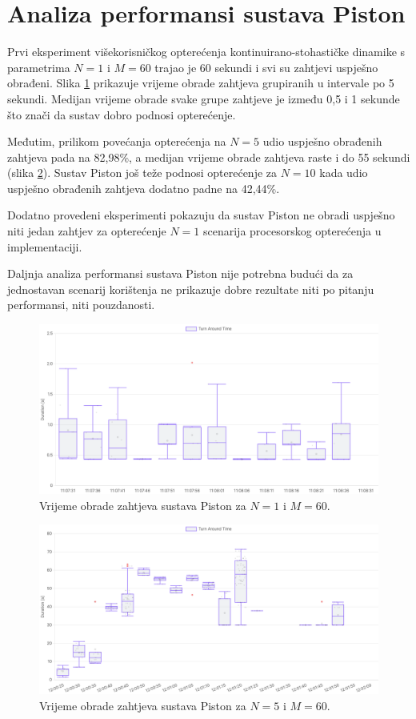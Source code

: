 \documentclass[times, utf8, diplomski]{fer}
\begin{document}
\section{Analiza performansi sustava Piston}
Prvi eksperiment višekorisničkog opterećenja kontinuirano-stohastičke dinamike s parametrima $N=1$ i $M=60$ trajao je 60 sekundi i svi su zahtjevi uspješno obrađeni. Slika \ref{fig:piston-1} prikazuje vrijeme obrade zahtjeva grupiranih u intervale po 5 sekundi. Medijan vrijeme obrade svake grupe zahtjeve je između 0,5 i 1 sekunde što znači da sustav dobro podnosi opterećenje. 

Međutim, prilikom povećanja opterećenja na $N=5$ udio uspješno obrađenih zahtjeva pada na 82,98\%, a medijan vrijeme obrade zahtjeva raste i do 55 sekundi (slika \ref{fig:piston-2}). Sustav Piston još teže podnosi opterećenje za $N=10$ kada udio uspješno obrađenih zahtjeva dodatno padne na 42,44\%.

Dodatno provedeni eksperimenti pokazuju da sustav Piston ne obradi uspješno niti jedan zahtjev za opterećenje $N=1$ scenarija procesorskog opterećenja u  implementaciji.

Daljnja analiza performansi sustava Piston nije potrebna budući da za jednostavan scenarij korištenja ne prikazuje dobre rezultate niti po pitanju performansi, niti pouzdanosti.

\begin{figure}[htb]
	\centering
	\includegraphics[width=\textwidth]{images/Piston TAT for 1 5s.png}
	\caption{
		Vrijeme obrade zahtjeva sustava Piston za $N=1$ i $M=60$.
	}
	\label{fig:piston-1}
\end{figure}

\begin{figure}[htb]
	\centering
	\includegraphics[width=\textwidth]{images/Piston TAT for 5 5s.png}
	\caption{
		Vrijeme obrade zahtjeva sustava Piston za $N=5$ i $M=60$.
	}
	\label{fig:piston-2}
\end{figure}
\end{document}
